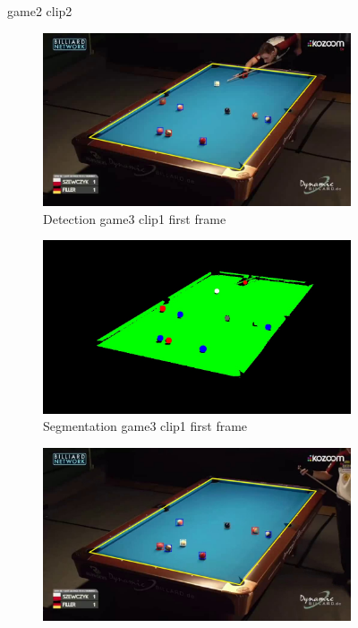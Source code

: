 \begin{figure}[H]
	\caption{game2 clip2}
\end{figure}

\begin{figure}[H]
	\centering
	\begin{subfigure}[b]{0.48\textwidth}
		\centering
		\includegraphics[width=\textwidth]{images/Detection/game3_clip1_detected_balls_first_frame.jpg}
		\caption{Detection game3 clip1 first frame}
		\label{fig: game3_clip1_first_frame_detected}
	\end{subfigure}
	\begin{subfigure}[b]{0.48\textwidth}
		\centering
		\includegraphics[width=\textwidth]{images/Segmentation/game3_clip1_segmented_balls_first_frame.jpg}
		\caption{Segmentation game3 clip1 first frame}
		\label{fig: game3_clip1_first_frame_segmented}
	\end{subfigure}
	\begin{subfigure}[b]{0.48\textwidth}
		\centering
		\includegraphics[width=\textwidth]{images/Detection/game3_clip1_detected_balls_last_frame.jpg}

\end{subfigure}
\end{figure}
